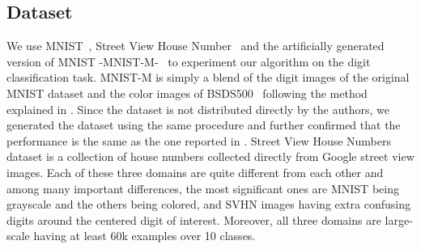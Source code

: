 \subsection{Dataset}
We use MNIST~\cite{mnist}, Street View House Number~\cite{svhn} and the artificially generated version of MNIST -MNIST-M-~\cite{ganin15} to experiment our algorithm on the digit classification task. MNIST-M is simply a blend of the digit images of the original MNIST dataset and the color images of BSDS500~\cite{bsds500} following the method explained in \cite{ganin15}. Since the dataset is not distributed directly by the authors, we generated the dataset using the same procedure and further confirmed that the performance is the same as the one reported in \cite{ganin15}. Street View House Numbers dataset is a collection of house numbers collected directly from Google street view images. Each of these three domains are quite different from each other and among many important differences, the most significant ones are MNIST being grayscale and the others being colored, and SVHN images having extra confusing digits around the centered digit of interest. Moreover, all three domains are large-scale having at least 60k examples over 10 classes. 

\begin{table}
\setlength{\tabcolsep}{3pt}
\caption{Accuracy on the digit classification task.}
\label{tab:res2}
\begin{sc}
\begin{small}
\end{small}
\end{sc}
\end{table}

